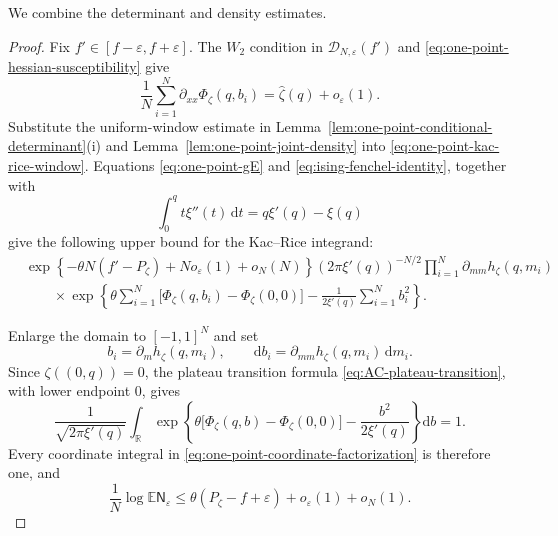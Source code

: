 \documentclass[a4paper,10pt,reqno]{amsart}
\numberwithin{equation}{section}
\newcommand{\ve}{\varepsilon}
\newcommand{\dE}{\mathbb{E}}%
\newcommand{\dd}{\mathrm{d}}
\begin{document}
	We combine the determinant and density estimates.
	
	\begin{proof}
		Fix \(f'\in[f-\ve,f+\ve]\). The \(W_2\) condition in
		\(\mathcal D_{N,\ve}(f')\) and
		\eqref{eq:one-point-hessian-susceptibility} give
		\[
		\frac1N\sum_{i=1}^N
		\partial_{xx}\Phi_\zeta(q,b_i)
		=
		\widehat\zeta(q)+o_\ve(1).
		\]
		Substitute the uniform-window estimate in
		Lemma~\ref{lem:one-point-conditional-determinant}\textup{(i)} and
		Lemma~\ref{lem:one-point-joint-density} into
		\eqref{eq:one-point-kac-rice-window}. Equations
		\eqref{eq:one-point-gE} and
		\eqref{eq:ising-fenchel-identity}, together with
		\[
		\int_0^q t\xi''(t)\,\dd t
		=q\xi'(q)-\xi(q)
		\]
		give the following upper bound for the Kac--Rice integrand:
		\begin{equation}\label{eq:one-point-coordinate-factorization}
			\begin{aligned}
				&\exp\left\{
				-\theta N(f'-P_\zeta)
				+N o_\ve(1)+o_N(N)
				\right\}
				(2\pi\xi'(q))^{-N/2}
				\prod_{i=1}^N\partial_{mm}h_\zeta(q,m_i)\\
				&\qquad\times
				\exp\left\{
				\theta\sum_{i=1}^N
				\bigl[
				\Phi_\zeta(q,b_i)-\Phi_\zeta(0,0)
				\bigr]
				-\frac1{2\xi'(q)}\sum_{i=1}^Nb_i^2
				\right\}.
			\end{aligned}
		\end{equation}
		
		Enlarge the domain to \([-1,1]^N\) and set
		\[
		b_i=\partial_m h_\zeta(q,m_i),
		\qquad
		\dd b_i
		=\partial_{mm}h_\zeta(q,m_i)\,\dd m_i.
		\]
		Since \(\zeta((0,q))=0\), the plateau transition formula
		\eqref{eq:AC-plateau-transition}, with lower endpoint \(0\), gives
		\[
		\frac1{\sqrt{2\pi\xi'(q)}}
		\int_{\mathbb R}
		\exp\left\{
		\theta\bigl[\Phi_\zeta(q,b)-\Phi_\zeta(0,0)\bigr]
		-\frac{b^2}{2\xi'(q)}
		\right\}\dd b
		=1.
		\]
		Every coordinate integral in
		\eqref{eq:one-point-coordinate-factorization} is therefore one, and
		\begin{equation}\label{eq:one-point-fixed-window-upper}
			\frac1N\log
			\dE\mathsf N_\ve
			\le
			\theta(P_\zeta-f+\ve)
			+o_\ve(1)+o_N(1).
		\end{equation}
		

\end{proof}
\end{document}
